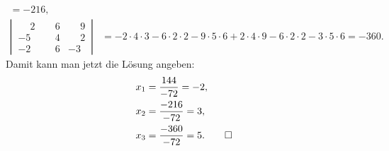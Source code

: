 \begin{loesung}
\begin{align*}
=-216,
\\
\left|\,\begin{matrix}
\phantom{-}2&\phantom{-}6&\phantom{-}9\\
         - 5&\phantom{-}4&\phantom{-}2\\
         - 2&\phantom{-}6&         - 3
\end{matrix}\,\right|
&=
-2\cdot4\cdot 3-6\cdot2\cdot 2-9\cdot5\cdot 6+2\cdot4\cdot 9-6\cdot 2\cdot 2-3\cdot 5\cdot 6
=-360.
\end{align*}
Damit kann man jetzt die Lösung angeben:
\begin{align*}
x_1&=\frac{144}{-72}=-2,\\
x_2&=\frac{-216}{-72}=3,\\
x_3&=\frac{-360}{-72}=5.
\qedhere
\end{align*}
\end{loesung}
